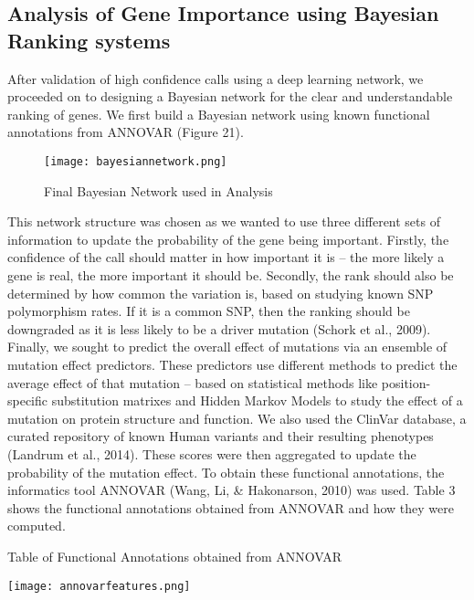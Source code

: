 \documentclass{article}
\begin{document}
\subsection{Analysis of Gene Importance using Bayesian Ranking systems}
After validation of high confidence calls using a deep learning network, we proceeded on to designing a Bayesian network for the clear and understandable ranking of genes. We first build a Bayesian network using known functional annotations from ANNOVAR (Figure 21). 


\begin{figure}[H]
\texttt{[image: bayesiannetwork.png]}
\caption{Final Bayesian Network used in Analysis}
\centering
\end{figure}

This network structure was chosen as we wanted to use three different sets of information to update the probability of the gene being important. Firstly, the confidence of the call should matter in how important it is -- the more likely a gene is real, the more important it should be. Secondly, the rank should also be determined by how common the variation is, based on studying known SNP polymorphism rates. If it is a common SNP, then the ranking should be downgraded as it is less likely to be a driver mutation (Schork et al., 2009). Finally, we sought to predict the overall effect of mutations via an ensemble of mutation effect predictors. These predictors use different methods to predict the average effect of that mutation -- based on statistical methods like position-specific substitution matrixes and Hidden Markov Models to study the effect of a mutation on protein structure and function. We also used the ClinVar database, a curated repository of known Human variants and their resulting phenotypes (Landrum et al., 2014). These scores were then aggregated to update the probability of the mutation effect. To obtain these functional annotations, the informatics tool ANNOVAR (Wang, Li, \& Hakonarson, 2010) was used. Table 3 shows the functional annotations obtained from ANNOVAR and how they were computed.

\begin{table}[H]
\caption{Table of Functional Annotations obtained from ANNOVAR}
\texttt{[image: annovarfeatures.png]}
\centering
\end{table}
\end{document}
